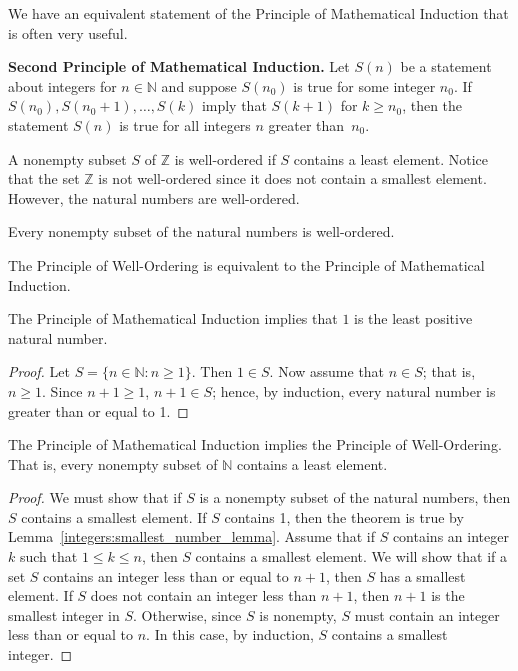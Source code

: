 We have an equivalent statement of the Principle of Mathematical Induction that is often very useful.
 
\medskip

\noindent 
{\bf Second Principle of Mathematical Induction.}  
Let $S(n)$ be a statement about integers for  $n \in {\mathbb N}$ and suppose $S(n_0)$ is true for some integer $n_0$.  If $S(n_0), S(n_0 + 1), \ldots, S(k)$ imply that $S(k + 1)$ for $k \geq n_0$, then the statement $S(n)$ is true for all integers $n$ greater than~$n_0$.   
 
\medskip

A  nonempty subset $S$ of ${\mathbb Z}$ is {\bfi well-ordered\/} if $S$ contains a least element.  Notice that the set ${\mathbb Z}$ is not well-ordered since it does not contain a smallest element.  However, the natural numbers are well-ordered. 
 
\medskip
 
Every nonempty subset of the natural numbers is well-ordered. 

\medskip
 
The Principle of Well-Ordering is equivalent to the Principle  of Mathematical Induction. 
 
\begin{lemma}\label{integers:smallest_number_lemma}
The Principle of Mathematical Induction implies that $1$ is the least positive natural number. 
\end{lemma}

\begin{proof}
Let $S = \{ n \in {\mathbb N} : n \geq 1 \}$. Then $1 \in S$.  Now assume that $n \in S$; that is, $n \geq 1$.  Since $n+1 \geq 1$, $n+ 1 \in S$; hence, by induction, every natural number is greater than or equal to 1. 
\end{proof}

\begin{theorem}\label{integers_PMI_implies_PWO}
The Principle of Mathematical Induction implies the Principle of Well-Ordering.  That is, every nonempty subset of $\mathbb N$ contains a least element.
\end{theorem}
 
\begin{proof}
We must show that if $S$ is a nonempty subset of the natural numbers, then $S$ contains a smallest element.  If $S$ contains 1, then the theorem is true by Lemma~\ref{integers:smallest_number_lemma}.  Assume that if $S$ contains an integer $k$ such that $1 \leq k \leq n$, then $S$ contains a smallest element.  We will show that if a set $S$ contains an integer less than or equal to $n + 1$, then $S$ has a smallest element.  If $S$ does not contain an integer less than $n+1$, then $n+1$ is the smallest integer in $S$.  Otherwise, since $S$ is nonempty, $S$ must contain an integer less than or equal to $n$. In this case, by induction, $S$ contains a smallest integer. 
\hspace*{1in} 
\end{proof}
 
